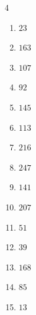 \begin{multicols}{4}
\begin{enumerate}

  \item $23$


  \item $163$


  \item $107$


  \item $92$


  \item $145$


  \item $113$


  \item $216$


  \item $247$


  \item $141$


  \item $207$


  \item $51$


  \item $39$


\columnbreak %

  \item $168$


  \item $85$


  \item $13$



\end{enumerate}
\end{multicols}
